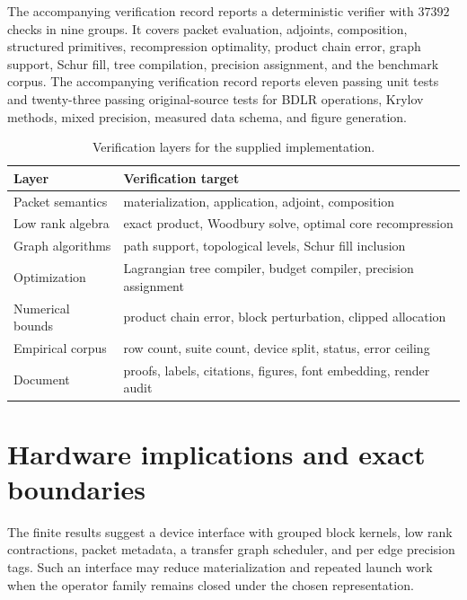 The accompanying verification record reports a deterministic verifier with $37392$ checks in nine groups. It covers packet evaluation, adjoints, composition, structured primitives, recompression optimality, product chain error, graph support, Schur fill, tree compilation, precision assignment, and the benchmark corpus. The accompanying verification record reports eleven passing unit tests and twenty-three passing original-source tests for BDLR operations, Krylov methods, mixed precision, measured data schema, and figure generation.

\begin{table}[t]
\centering
\small
\begin{tabular}{>{\raggedright\arraybackslash}p{}>{\raggedright\arraybackslash}p{}}
\toprule
Layer & Verification target \\
\midrule
Packet semantics & materialization, application, adjoint, composition \\
Low rank algebra & exact product, Woodbury solve, optimal core recompression \\
Graph algorithms & path support, topological levels, Schur fill inclusion \\
Optimization & Lagrangian tree compiler, budget compiler, precision assignment \\
Numerical bounds & product chain error, block perturbation, clipped allocation \\
Empirical corpus & row count, suite count, device split, status, error ceiling \\
Document & proofs, labels, citations, figures, font embedding, render audit \\
\bottomrule
\end{tabular}
\caption{Verification layers for the supplied implementation.}
\label{tab:verification_layers}
\end{table}

\section{Hardware implications and exact boundaries}\label{main:section:014}\label{sec:boundaries}

The finite results suggest a device interface with grouped block kernels, low rank contractions, packet metadata, a transfer graph scheduler, and per edge precision tags. Such an interface may reduce materialization and repeated launch work when the operator family remains closed under the chosen representation.

